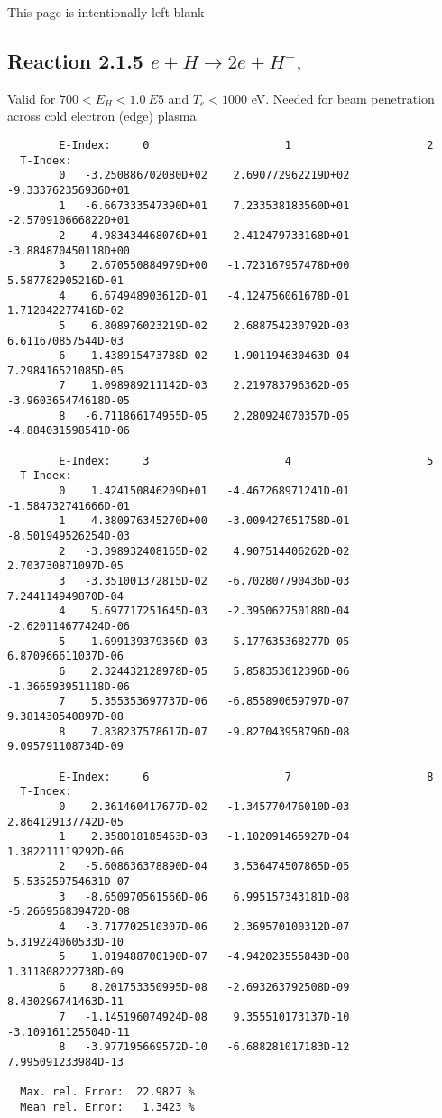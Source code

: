 \documentclass[12pt,dvipdfmx]{article}
\begin{document}
\newpage
This page is intentionally left blank
\newpage
\subsection{
Reaction 2.1.5  $e + H \rightarrow 2e + H^+ ,\ $ }

Valid for $ 700 < E_H < 1.0~ E5$ and $T_e  < 1000$ eV.
Needed for beam penetration across cold electron (edge) plasma.

\begin{small}\begin{verbatim}
        E-Index:     0                     1                     2
  T-Index:
        0   -3.250886702080D+02    2.690772962219D+02   -9.333762356936D+01
        1   -6.667333547390D+01    7.233538183560D+01   -2.570910666822D+01
        2   -4.983434468076D+01    2.412479733168D+01   -3.884870450118D+00
        3    2.670550884979D+00   -1.723167957478D+00    5.587782905216D-01
        4    6.674948903612D-01   -4.124756061678D-01    1.712842277416D-02
        5    6.808976023219D-02    2.688754230792D-03    6.611670857544D-03
        6   -1.438915473788D-02   -1.901194630463D-04    7.298416521085D-05
        7    1.098989211142D-03    2.219783796362D-05   -3.960365474618D-05
        8   -6.711866174955D-05    2.280924070357D-05   -4.884031598541D-06

        E-Index:     3                     4                     5
  T-Index:
        0    1.424150846209D+01   -4.467268971241D-01   -1.584732741666D-01
        1    4.380976345270D+00   -3.009427651758D-01   -8.501949526254D-03
        2   -3.398932408165D-02    4.907514406262D-02    2.703730871097D-05
        3   -3.351001372815D-02   -6.702807790436D-03    7.244114949870D-04
        4    5.697717251645D-03   -2.395062750188D-04   -2.620114677424D-06
        5   -1.699139379366D-03    5.177635368277D-05    6.870966611037D-06
        6    2.324432128978D-05    5.858353012396D-06   -1.366593951118D-06
        7    5.355353697737D-06   -6.855890659797D-07    9.381430540897D-08
        8    7.838237578617D-07   -9.827043958796D-08    9.095791108734D-09

        E-Index:     6                     7                     8
  T-Index:
        0    2.361460417677D-02   -1.345770476010D-03    2.864129137742D-05
        1    2.358018185463D-03   -1.102091465927D-04    1.382211119292D-06
        2   -5.608636378890D-04    3.536474507865D-05   -5.535259754631D-07
        3   -8.650970561566D-06    6.995157343181D-08   -5.266956839472D-08
        4   -3.717702510307D-06    2.369570100312D-07    5.319224060533D-10
        5    1.019488700190D-07   -4.942023555843D-08    1.311808222738D-09
        6    8.201753350995D-08   -2.693263792508D-09    8.430296741463D-11
        7   -1.145196074924D-08    9.355510173137D-10   -3.109161125504D-11
        8   -3.977195669572D-10   -6.688281017183D-12    7.995091233984D-13

  Max. rel. Error:  22.9827 %
  Mean rel. Error:   1.3423 %

\end{verbatim}\end{small}
\end{document}
